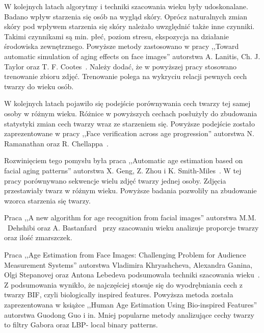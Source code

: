\documentclass[a4paper,twoside,12pt]{book}
\begin{document}
    W kolejnych latach algorytmy i techniki szacowania wieku były udoskonalane.
    Badano wpływ starzenia się osób na
    wygląd skóry.
    Oprócz naturalnych zmian skóry pod wpływem starzenia się skóry należało uwzględnić także inne
    czynniki.
    Takimi czynnikami są min.
    płeć, poziom stresu, ekspozycja na działanie środowiska zewnętrznego.
    Powyższe metody zastosowano w pracy ,,Toward automatic simulation
    of aging effects on face images'' autorstwa A. Lanitis, Ch. J. Taylor oraz T. F. Cootes~\cite{lanitisTaylor}.
    Należy dodać, że w powyższej pracy stosowano trenowanie zbioru zdjęć.
    Trenowanie polega na wykryciu relacji pewnych cech twarzy do wieku osób.

    W kolejnych latach pojawiło się podejście porównywania cech twarzy tej samej osoby w różnym wieku.
    Różnice w powyższych cechach posłużyły do zbudowania statystyki zmian cech twarzy wraz ze starzeniem się.
    Powyższe podejście zostało zaprezentowane w pracy ,,Face verification across age progression''
    autorstwa N. Ramanathan oraz R. Chellappa~\cite{ramanthanChelappa}.

    Rozwinięciem tego pomysłu była praca ,,Automatic age estimation based
    on facial aging patterns'' autorstwa X. Geng, Z. Zhou i K. Smith-Miles~\cite{gengZhou}.
    W tej pracy porównywano sekwencje wielu zdjęć twarzy jednej osoby.
    Zdjęcia przestawiały twarz w różnym wieku.
    Powyższe badania pozwoliły na zbudowanie wzorca starzenia się twarzy.

    Praca ,,A new algorithm for age recognition
    from facial images'' autorstwa M.M. \ Dehshibi oraz A. Bastanfard~\cite{dehshibiBastard} przy szacowaniu wieku
    analizuje proporcje twarzy oraz ilość zmarszczek.

    Praca ,,Age Estimation from Face Images: Challenging
    Problem for Audience Measurement Systems'' autorstwa
    Vladimira Khryashcheva, Alexandra Ganina, Olgi Stepanovej oraz
    Antona Lebedeva podsumowała techniki szacowania wieku~\cite{khryashchevGanin}.
    Z podsumowania wynikło, że najczęściej stosuje się do wyodrębniania cech z twarzy BIF,
    czyli biologically inspired features.
    Powyższa metoda została zaprezentowana w książce ,,Human Age Estimation Using Bio-inspired Features''
    autorstwa Guodong Guo i in.
    Mniej popularne metody analizujące cechy twarzy to filtry Gabora oraz LBP- local binary patterns.
\end{document}
